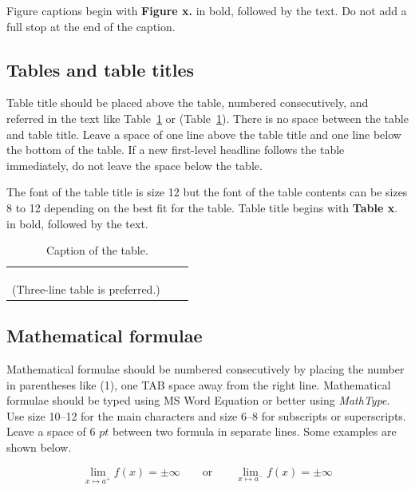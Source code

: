 \documentclass{aims}
\numberwithin{equation}{section}
\theoremstyle{definition}
\begin{document}
 Figure captions begin with \textbf{Figure x.} in bold, followed by the text. Do not add a full stop at the end of the caption. 

\subsection{Tables and table titles}

Table title should be placed above the table, numbered consecutively, and referred in the text like Table~\ref{table} or (Table~\ref{table}). There is no space between the table and table title. Leave a space of one line above the table title and one line below the bottom of the table. If a new first-level headline follows the table immediately, do not leave the space below the table.

The font of the table title is size 12 but the font of the table contents can be sizes 8 to 12 depending on the best fit for the table. Table title begins with \textbf{Table x}. in bold, followed by the text. 

\begin{table}[H]
\begin{center}
\caption{Caption of the table.}
\begin{tabular}{ccc} \hline
 & & \\\hline
 & & \\
 & & \\
 & & \\\hline
(Three-line table is preferred.)
\end{tabular}
	\label{table}
\end{center}
\end{table}

\subsection{Mathematical formulae}
Mathematical formulae should be numbered consecutively by placing the number in parentheses like (1), one TAB space away from the right line. Mathematical formulae should be typed using MS Word Equation or better using \emph{MathType}. Use size 10--12 for the main characters and size 6--8 for subscripts or superscripts. Leave a space of 6 $pt$ between two formula in separate lines. Some examples are shown below. 

\begin{equation}
\lim_{x \mapsto a^+ }f\left ( x \right )= \pm \infty \qquad \text{or} \qquad \lim_{x \mapsto a^- }f\left ( x \right )= \pm \infty
\label{equation1}
\end{equation}
\end{document}
